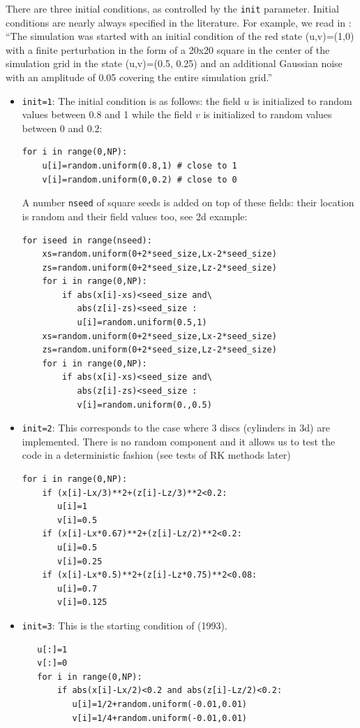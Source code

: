 There are three initial conditions, as controlled by the \lstinline{init} parameter.
Initial conditions are nearly always specified in the literature. For example, we
read in \cite{haqh16}: 
``The simulation was started with an initial condition of the
red state (u,v)=(1,0) with a finite perturbation in the form of a 20x20 square in the
center of the simulation grid in the state (u,v)=(0.5, 0.25) and an additional Gaussian
noise with an amplitude of 0.05 covering the entire simulation grid.''


\begin{itemize}
\item \lstinline{init=1}:
The initial condition is as follows: the field $u$ is initialized
to random values between 0.8 and 1 while the field $v$ is 
initialized to random values between 0 and 0.2:
\begin{lstlisting}
for i in range(0,NP):
    u[i]=random.uniform(0.8,1) # close to 1
    v[i]=random.uniform(0,0.2) # close to 0 
\end{lstlisting}
A number \lstinline{nseed} of square seeds is added on top
of these fields: their location is random and their field values too,
see 2d example:
\begin{lstlisting}
for iseed in range(nseed):
    xs=random.uniform(0+2*seed_size,Lx-2*seed_size)
    zs=random.uniform(0+2*seed_size,Lz-2*seed_size)
    for i in range(0,NP):
        if abs(x[i]-xs)<seed_size and\
           abs(z[i]-zs)<seed_size :
           u[i]=random.uniform(0.5,1)
    xs=random.uniform(0+2*seed_size,Lx-2*seed_size)
    zs=random.uniform(0+2*seed_size,Lz-2*seed_size)
    for i in range(0,NP):
        if abs(x[i]-xs)<seed_size and\
           abs(z[i]-zs)<seed_size :
           v[i]=random.uniform(0.,0.5)
\end{lstlisting}

\item \lstinline{init=2}: 
This corresponds to the case where 3 discs (cylinders in 3d)
are implemented. There is no random component and it allows 
us to test the code in a deterministic fashion (see 
tests of RK methods later)
\begin{lstlisting}
for i in range(0,NP):
    if (x[i]-Lx/3)**2+(z[i]-Lz/3)**2<0.2:
       u[i]=1
       v[i]=0.5
    if (x[i]-Lx*0.67)**2+(z[i]-Lz/2)**2<0.2:
       u[i]=0.5
       v[i]=0.25
    if (x[i]-Lx*0.5)**2+(z[i]-Lz*0.75)**2<0.08:
       u[i]=0.7
       v[i]=0.125
\end{lstlisting}

\item \lstinline{init=3}: 
This is the starting condition of \textcite{pear93} (1993).
\begin{lstlisting}
   u[:]=1
   v[:]=0
   for i in range(0,NP):
       if abs(x[i]-Lx/2)<0.2 and abs(z[i]-Lz/2)<0.2:
          u[i]=1/2+random.uniform(-0.01,0.01)
          v[i]=1/4+random.uniform(-0.01,0.01)
\end{lstlisting}


\end{itemize}
